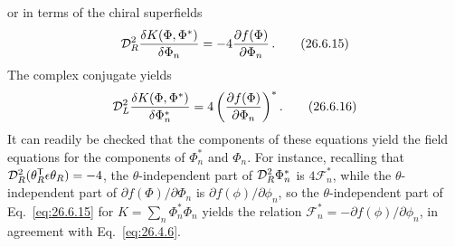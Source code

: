 or in terms of the chiral superfields
\begin{equation}
  \mathcal{D}_R^2
  \frac{\delta K(\Phi,\Phi^*)}{\delta\Phi_n}
  =-4\frac{\partial f(\Phi)}{\partial\Phi_n}\,.
  \tag{26.6.15}\label{eq:26.6.15}
\end{equation}
The complex conjugate yields
\begin{equation}
  \mathcal{D}_L^2
  \frac{\delta K(\Phi,\Phi^*)}{\delta\Phi_n^*}
  =4\left(\frac{\partial f(\Phi)}{\partial\Phi_n}\right)^* .
  \tag{26.6.16}\label{eq:26.6.16}
\end{equation}
It can readily be checked that the components of these equations yield the
field equations for the components of \(\Phi_n^*\) and \(\Phi_n\). For
instance, recalling that
\(\mathcal{D}_R^2(\theta_R^{\mathsf T}\epsilon\theta_R)=-4\), the
\(\theta\)-independent part of \(\mathcal{D}_R^2\Phi_n^*\) is
\(4\mathcal{F}_n^*\), while the \(\theta\)-independent part of
\(\partial f(\Phi)/\partial\Phi_n\) is
\(\partial f(\phi)/\partial\phi_n\), so the \(\theta\)-independent part of
Eq.~\eqref{eq:26.6.15} for \(K=\sum_n\Phi_n^*\Phi_n\) yields the relation
\(\mathcal{F}_n^*=-\partial f(\phi)/\partial\phi_n\), in agreement with
Eq.~\eqref{eq:26.4.6}.

